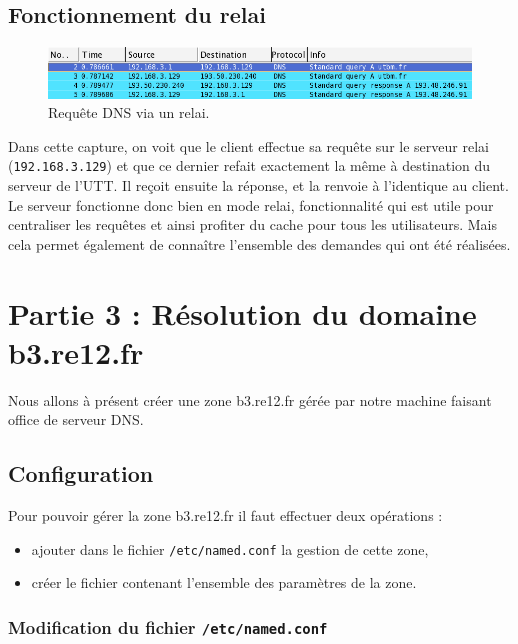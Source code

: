 \documentclass[12pt,a4paper,notitlepage]{article}
\begin{document}
\subsection{Fonctionnement du relai}

\begin{figure}[!h]
\begin{center}
\includegraphics[scale=0.61]{capture-via-relai}
\caption{Requête DNS via un relai.}
\label{fig:da}
\end{center}
\end{figure}

Dans cette capture, on voit que le client effectue sa requête sur le serveur relai (\texttt{192.168.3.129}) et que ce dernier refait exactement la même à destination du serveur de l'UTT. Il reçoit ensuite la réponse, et la renvoie à l'identique au client. Le serveur fonctionne donc bien en mode relai, fonctionnalité qui est utile pour centraliser les requêtes et ainsi profiter du cache pour tous les utilisateurs. Mais cela permet également de connaître l'ensemble des demandes qui ont été réalisées.



\section{Partie 3 : Résolution du domaine b3.re12.fr}

Nous allons à présent créer une zone b3.re12.fr gérée par notre machine faisant office de serveur DNS.

\subsection{Configuration}

Pour pouvoir gérer la zone b3.re12.fr il faut effectuer deux opérations :
\begin{itemize}
\item ajouter dans le fichier \texttt{/etc/named.conf} la gestion de cette zone,
\item créer le fichier contenant l'ensemble des paramètres de la zone.
\end{itemize}

\bigskip

\subsubsection{Modification du fichier \texttt{/etc/named.conf}}
\end{document}
